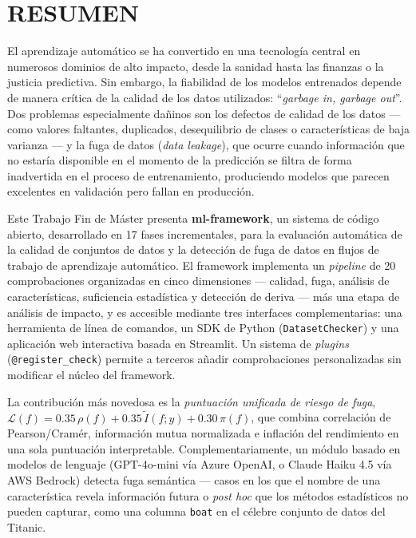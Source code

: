\documentclass[12pt,a4paper]{report}
\begin{document}
\chapter*{RESUMEN}

El aprendizaje automático se ha convertido en una tecnolog\'ia central en numerosos dominios
de alto impacto, desde la sanidad hasta las finanzas o la justicia predictiva. Sin embargo, la
fiabilidad de los modelos entrenados depende de manera cr\'itica de la calidad de los datos
utilizados: ``\textit{garbage in, garbage out}''. Dos problemas especialmente da\~{n}inos son
los defectos de calidad de los datos --- como valores faltantes, duplicados, desequilibrio de
clases o caracter\'isticas de baja varianza --- y la fuga de datos (\textit{data leakage}), que
ocurre cuando informaci\'on que no estar\'ia disponible en el momento de la predicci\'on se
filtra de forma inadvertida en el proceso de entrenamiento, produciendo modelos que parecen
excelentes en validaci\'on pero fallan en producci\'on.

Este Trabajo Fin de M\'aster presenta \textbf{ml-framework}, un sistema de c\'odigo abierto,
desarrollado en 17 fases incrementales, para la evaluaci\'on autom\'atica de la calidad de
conjuntos de datos y la detecci\'on de fuga de datos en flujos de trabajo de aprendizaje
autom\'atico. El framework implementa un \textit{pipeline} de 20 comprobaciones organizadas en
cinco dimensiones --- calidad, fuga, an\'alisis de caracter\'isticas, suficiencia estad\'istica
y detecci\'on de deriva --- m\'as una etapa de an\'alisis de impacto, y es accesible mediante
tres interfaces complementarias: una herramienta de l\'inea de comandos, un SDK de Python (\texttt{DatasetChecker})
y una aplicaci\'on web interactiva basada en Streamlit. Un sistema de \textit{plugins}
(\texttt{@register\_check}) permite a terceros a\~{n}adir comprobaciones personalizadas sin
modificar el n\'ucleo del framework.

La contribuci\'on m\'as novedosa es la \textit{puntuaci\'on unificada de riesgo de fuga},
$\mathcal{L}(f) = 0.35\,\rho(f) + 0.35\,\tilde{I}(f;y) + 0.30\,\pi(f)$, que combina
correlaci\'on de Pearson/Cram\'er, informaci\'on mutua normalizada e inflaci\'on del
rendimiento en una sola puntuaci\'on interpretable. Complementariamente, un m\'odulo
basado en modelos de lenguaje (GPT-4o-mini v\'ia Azure OpenAI, o Claude Haiku 4.5 v\'ia AWS
Bedrock) detecta fuga sem\'antica --- casos en los que el nombre de una
caracter\'istica revela informaci\'on futura o \textit{post hoc} que los m\'etodos estad\'isticos
no pueden capturar, como una columna \texttt{boat} en el c\'elebre conjunto de datos del Titanic.
\end{document}

